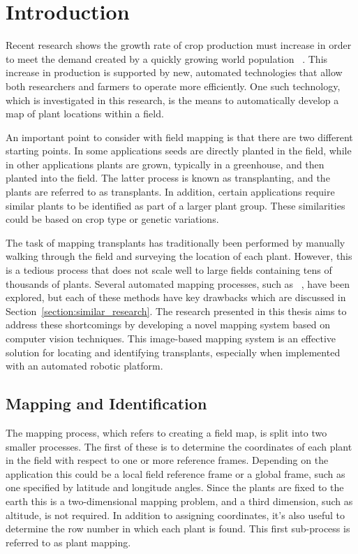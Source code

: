 
\cleardoublepage

\chapter{Introduction}
\label{introduction}

Recent research shows the growth rate of crop production must increase in order to meet the demand created by a quickly growing world population ~\citep{tester:2010}.  This increase in production is supported by new, automated technologies that allow both researchers and farmers to operate more efficiently. One such technology, which is investigated in this research, is the means to automatically develop a map of plant locations within a field. 
 
An important point to consider with field mapping is that there are two different starting points.  In some applications seeds are directly planted in the field, while in other applications plants are grown, typically in a greenhouse, and then planted into the field.  The latter process is known as transplanting, and the plants are referred to as transplants.  In addition, certain applications require similar plants to be identified as part of a larger plant group.  These similarities could be based on crop type or genetic variations. 

The task of mapping transplants has traditionally been performed by manually walking through the field and surveying the location of each plant. However, this is a tedious process that does not scale well to large fields containing tens of thousands of plants.  Several automated mapping processes, such as ~\citep{Perez-Ruiz:2012}, have been explored, but each of these methods have key drawbacks which are discussed in Section~\ref{section:similar_research}.  The research presented in this thesis aims to address these shortcomings by developing a novel mapping system based on computer vision techniques.  This image-based mapping system is an effective solution for locating and identifying transplants, especially when implemented with an automated robotic platform. 

\section{Mapping and Identification}

The mapping process, which refers to creating a field map, is split into two smaller processes.  The first of these is to determine the coordinates of each plant in the field with respect to one or more reference frames.  Depending on the application this could be a local field reference frame or a global frame, such as one specified by latitude and longitude angles.  Since the plants are fixed to the earth this is a two-dimensional mapping problem, and a third dimension, such as altitude, is not required.  In addition to assigning coordinates, it's also useful to determine the row number in which each plant is found.  This first sub-process is referred to as plant mapping. 

